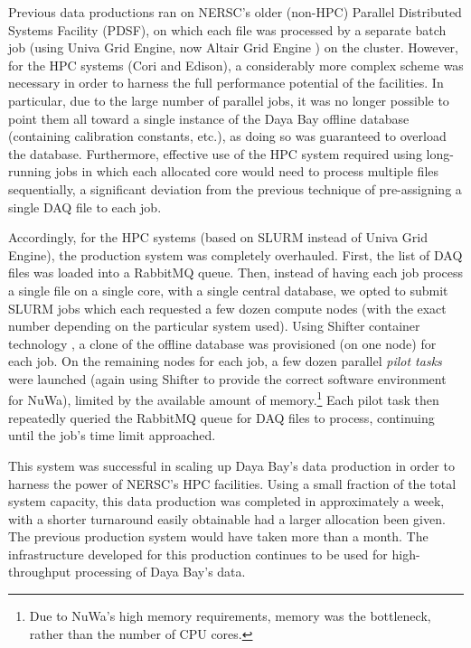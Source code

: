\documentclass[../thesis.tex]{subfiles}
\begin{document}
Previous data productions ran on NERSC's older (non-HPC) Parallel Distributed Systems Facility (PDSF), on which each file was processed by a separate batch job (using Univa Grid Engine, now Altair Grid Engine \cite{AltairGridEngine}) on the cluster. However, for the HPC systems (Cori and Edison), a considerably more complex scheme was necessary in order to harness the full performance potential of the facilities. In particular, due to the large number of parallel jobs, it was no longer possible to point them all toward a single instance of the Daya Bay offline database (containing calibration constants, etc.), as doing so was guaranteed to overload the database. Furthermore, effective use of the HPC system required using long-running jobs in which each allocated core would need to process multiple files sequentially, a significant deviation from the previous technique of pre-assigning a single DAQ file to each job.

Accordingly, for the HPC systems (based on SLURM \cite{SLURM} instead of Univa Grid Engine), the production system was completely overhauled. First, the list of DAQ files was loaded into a RabbitMQ \cite{RabbitMQ} queue. Then, instead of having each job process a single file on a single core, with a single central database, we opted to submit SLURM jobs which each requested a few dozen compute nodes (with the exact number depending on the particular system used). Using Shifter container technology \cite{shifter}, a clone of the offline database was provisioned (on one node) for each job. On the remaining nodes for each job, a few dozen parallel \emph{pilot tasks} were launched (again using Shifter to provide the correct software environment for NuWa), limited by the available amount of memory.\footnote{Due to NuWa's high memory requirements, memory was the bottleneck, rather than the number of CPU cores.} Each pilot task then repeatedly queried the RabbitMQ queue for DAQ files to process, continuing until the job's time limit approached.

This system was successful in scaling up Daya Bay's data production in order to harness the power of NERSC's HPC facilities. Using a small fraction of the total system capacity, this data production was completed in approximately a week, with a shorter turnaround easily obtainable had a larger allocation been given. The previous production system would have taken more than a month. The infrastructure developed for this production continues to be used for high-throughput processing of Daya Bay's data.
\end{document}

